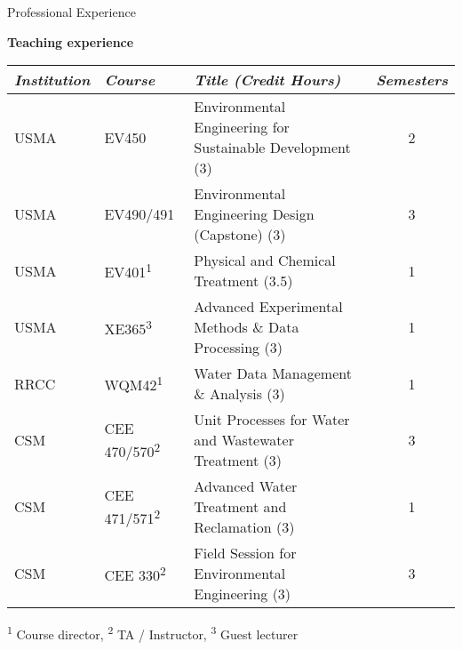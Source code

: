 \documentclass{resume} %
\begin{document}
\begin{rSection}{Professional Experience}
\begin{table}[h]
\centering
\textbf{Teaching experience}
\begin{tabular}{lllc}
\toprule
  \emph{Institution} & \emph{Course} & \emph{Title (Credit Hours)} & \emph{Semesters}\\
\midrule			
  USMA & EV450 & Environmental Engineering for Sustainable Development (3) & 2 \\
  USMA & EV490/491 & Environmental Engineering Design (Capstone) (3) & 3  \\
  USMA & EV401\textsuperscript{1} & Physical and Chemical Treatment (3.5) & 1  \\
  USMA & XE365\textsuperscript{3} & Advanced Experimental Methods \& Data Processing (3) & 1  \\
  RRCC & WQM42\textsuperscript{1} & Water Data Management \& Analysis (3) & 1 \\
  CSM & CEE 470/570\textsuperscript{2} & Unit Processes for Water and Wastewater Treatment (3) & 3 \\
  CSM & CEE 471/571\textsuperscript{2} & Advanced Water Treatment and Reclamation (3) & 1 \\
  CSM & CEE 330\textsuperscript{2} & Field Session for Environmental Engineering (3) & 3  \\
\bottomrule
\end{tabular}

\smallskip\footnotesize{\textsuperscript{1} Course director, \textsuperscript{2} TA / Instructor, \textsuperscript{3} Guest lecturer}

\end{table}

\end{rSection}

\end{document}
